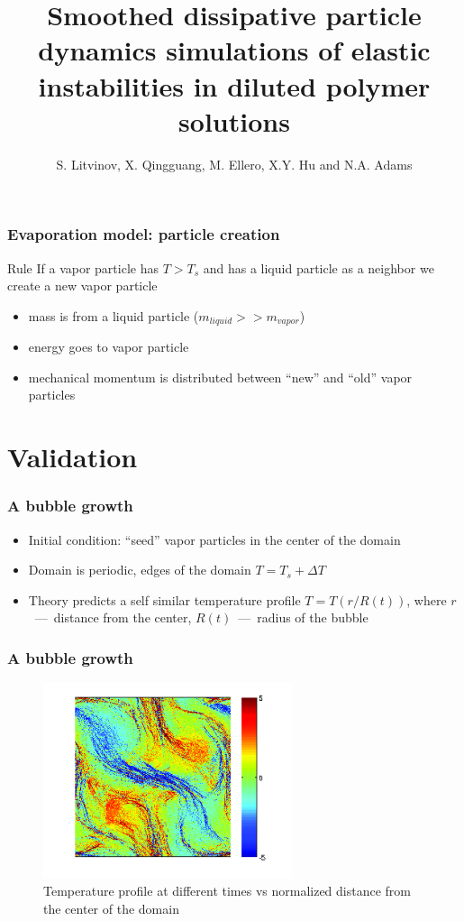 \documentclass{beamer}
\title[elastic instabilities]{Smoothed dissipative particle dynamics simulations of elastic instabilities in diluted polymer solutions}
\date{}
\author{S. Litvinov, X. Qingguang, M. Ellero, X.Y. Hu and N.A. Adams}
\institute{
  Lehrstuhl f\"{u}r Aerodynamik und Str\"{o}mungsmechanik \\
  TU M\"{u}nchen
}
\begin{document}
\begin{frame}
  \titlepage
\end{frame}

\begin{frame}
  \tableofcontents
\end{frame}







\begin{frame}
  \frametitle{Evaporation model: particle creation}
  \begin{block}{Rule}
    If a vapor particle has $T>T_s$ and has a liquid particle as a
    neighbor we create a new vapor particle
  \end{block}
  \begin{itemize}
  \item mass is from a liquid particle ($m_{liquid} >> m_{vapor}$)
  \item energy goes to vapor particle
  \item mechanical momentum is distributed between ``new'' and ``old''
    vapor particles
  \end{itemize}
\end{frame}

\section{Validation}
\begin{frame}
  \frametitle{A bubble growth}
  \begin{itemize}
  \item Initial condition: ``seed'' vapor particles in the center of
    the domain
  \item Domain is periodic, edges of the domain $T=T_s +
    \Delta T$
  \item Theory predicts a self similar temperature profile $T =
    T(r/R(t))$, where $r$~---~distance from the center, $R(t)$~---~radius of
    the bubble
  \end{itemize}
\end{frame}

\begin{frame}
  \frametitle{A bubble growth}
  \begin{figure}
    \centering
    \includegraphics[width=0.65\textwidth]{img/polymer_loc-14.png}
    \caption{Temperature profile at different times vs normalized
      distance from the center of the domain}
    \label{fig:self}
  \end{figure}
\end{frame}
\end{document}
